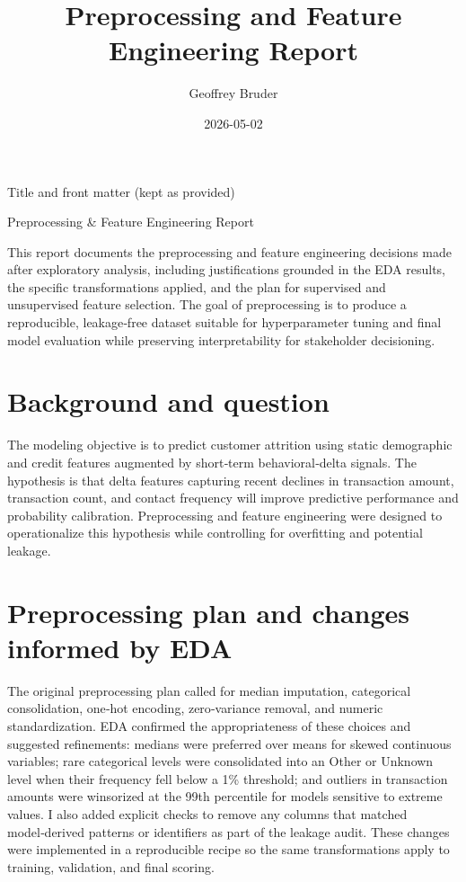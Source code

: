 \documentclass[
  12pt,
]{article}
\title{Preprocessing and Feature Engineering Report}
\author{Geoffrey Bruder}
\date{2026-05-02}
\begin{document}
\maketitle

{
\setcounter{tocdepth}{2}
\tableofcontents
}
Title and front matter (kept as provided)

Preprocessing \& Feature Engineering Report

This report documents the preprocessing and feature engineering
decisions made after exploratory analysis, including justifications
grounded in the EDA results, the specific transformations applied, and
the plan for supervised and unsupervised feature selection. The goal of
preprocessing is to produce a reproducible, leakage‑free dataset
suitable for hyperparameter tuning and final model evaluation while
preserving interpretability for stakeholder decisioning.

\section{Background and question}\label{background-and-question}

The modeling objective is to predict customer attrition using static
demographic and credit features augmented by short‑term behavioral‑delta
signals. The hypothesis is that delta features capturing recent declines
in transaction amount, transaction count, and contact frequency will
improve predictive performance and probability calibration.
Preprocessing and feature engineering were designed to operationalize
this hypothesis while controlling for overfitting and potential leakage.

\section{Preprocessing plan and changes informed by
EDA}\label{preprocessing-plan-and-changes-informed-by-eda}

The original preprocessing plan called for median imputation,
categorical consolidation, one‑hot encoding, zero‑variance removal, and
numeric standardization. EDA confirmed the appropriateness of these
choices and suggested refinements: medians were preferred over means for
skewed continuous variables; rare categorical levels were consolidated
into an Other or Unknown level when their frequency fell below a 1\%
threshold; and outliers in transaction amounts were winsorized at the
99th percentile for models sensitive to extreme values. I also added
explicit checks to remove any columns that matched model‑derived
patterns or identifiers as part of the leakage audit. These changes were
implemented in a reproducible recipe so the same transformations apply
to training, validation, and final scoring.
\end{document}
